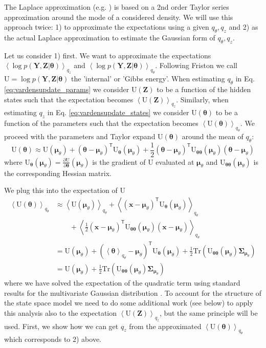 \documentclass[a4paper,10pt]{article}
\newcommand{\bs}[1]{\mathbf{#1}}					%
\newcommand{\bgs}[1]{\boldsymbol{#1}}				%
\newcommand{\pd}[2]{\frac{\partial #1}{\partial #2}} 	%
\newcommand{\tr}{\mathsf{T}}				%
\newcommand{\eq}[1]{\begin{equation} #1 \end{equation}}%
\newcommand{\trace}[1]{\mathrm{Tr}\left(#1\right)}					%
\renewcommand{\ss}{z}         %
\newcommand{\sh}{x}         %
\newcommand{\spm}{\mu}    %
\renewcommand{\sp}{\theta}    %
\newcommand{\ph}{\bs{\sh}}    %
\newcommand{\ppm}{\bgs{\spm}}   %
\newcommand{\pp}{\bgs{\sp}} %
\newcommand{\Ps}{\bs{Z}}    %
\newcommand{\Po}{\bs{Y}}    %
\newcommand{\E}[2][]{\left\langle #2 \right\rangle_{#1}}	%
\newcommand{\U}{\mathrm{U}}			%
\newcommand{\Cov}{\bgs{\Sigma}}			%
\begin{document}
The Laplace approximation (e.g. \cite[p. 255]{Murphy2012}) is based on a 2nd order Taylor series approximation around the mode of a considered density. We will use this approach twice: 1) to approximate the expectations using a given $q_\sp, q_\ss$ and 2) as the actual Laplace approximation to estimate the Gaussian form of $q_\sp, q_\ss$.

Let us consider 1) first. We want to approximate the expectations $\E[q_\ss]{\log p(\Po,\Ps|\pp)}$ and $\E[q_\sp]{\log p(\Po,\Ps|\pp)}$. Following Friston we call $\U = \log p(\Po,\Ps|\pp)$ the 'internal' or 'Gibbs energy'. When estimating $q_\sp$ in Eq. \ref{eq:vardensupdate_params} we consider $\U(\Ps)$ to be a function of the hidden states such that the expectation becomes $\E[q_\ss]{\U(\Ps)}$. Similarly, when estimating $q_\ss$ in Eq. \ref{eq:vardensupdate_states} we consider $\U(\pp)$ to be a function of the parameters such that the expectation becomes $\E[q_\sp]{\U(\pp)}$. We proceed with the parameters and Taylor expand $\U(\pp)$ around the mean of $q_\sp$:
\eq{
    \U(\pp) \approx \U(\ppm_\sp) + (\pp - \ppm_\sp)^\tr \U_{\pp}(\ppm_\sp) + \frac{1}{2}(\pp - \ppm_\sp)^\tr \U_{\pp\pp}(\ppm_\sp) (\pp - \ppm_\sp)
}
where $\U_{\pp}(\ppm_\sp) = \pd{\U}{\pp}(\ppm_\sp)$ is the gradient of $\U$ evaluated at $\ppm_\sp$ and $\U_{\pp\pp}(\ppm_\sp)$ is the corresponding Hessian matrix.

We plug this into the expectation of $\U$
\begin{align}
    \E[q_\sp]{\U(\pp)} &\approx 
            \E[q_\sp]{\U(\ppm_\sp)} + \E[q_\sp]{(\ph - \ppm_\sp)^\tr \U_{\pp}(\ppm_\sp)}\nonumber\\
               & \qquad + \E[q_\sp]{\frac{1}{2}(\ph - \ppm_\sp)^\tr \U_{\pp\pp}(\ppm_\sp) (\ph - \ppm_\sp)}\\
        &= \U(\ppm_\sp) + \left(\E[q_\sp]{\pp} - \ppm_\sp\right)^\tr \U_{\pp}(\ppm_\sp) + \frac{1}{2}\trace{\U_{\pp\pp}(\ppm_\sp)\Cov_{\ppm_\sp}}\\
        &= \U(\ppm_\sp) + \frac{1}{2}\trace{\U_{\pp\pp}(\ppm_\sp)\Cov_{\ppm_\sp}}
\end{align}
where we have solved the expectation of the quadratic term using standard results for the multivariate Gaussian distribution \citep[][eq. (357)]{Petersen2008}. To account for the structure of the state space model we need to do some additional work (see below) to apply this analysis also to the expectation $\E[q_\ss]{\U(\Ps)}$, but the same principle will be used. First, we show how we can get $q_\ss$ from the approximated $\E[q_\sp]{\U(\pp)}$ which corresponds to 2) above.
\end{document}
